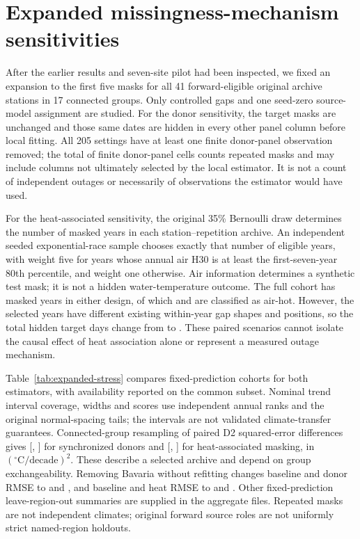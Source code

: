 \section{Expanded missingness-mechanism sensitivities}
After the earlier results and seven-site pilot had been inspected, we fixed an expansion to the first five masks for all 41 forward-eligible original archive stations in 17 connected groups. Only controlled gaps and one seed-zero source-model assignment are studied. For the donor sensitivity, the target masks are unchanged and those same dates are hidden in every other panel column before local fitting. All 205 settings have at least one finite donor-panel observation removed; the total of \ESDonorCells{} finite donor-panel cells counts repeated masks and may include columns not ultimately selected by the local estimator. It is not a count of independent outages or necessarily of observations the estimator would have used.

For the heat-associated sensitivity, the original 35\% Bernoulli draw determines the number of masked years in each station--repetition archive. An independent seeded exponential-race sample chooses exactly that number of eligible years, with weight five for years whose annual air H30 is at least the first-seven-year 80th percentile, and weight one otherwise. Air information determines a synthetic test mask; it is not a hidden water-temperature outcome. The full cohort has \ESYears{} masked years in either design, of which \ESHotBaseline{} and \ESHotHeat{} are classified as air-hot. However, the selected years have different existing within-year gap shapes and positions, so the total hidden target days change from \ESDaysBaseline{} to \ESDaysHeat{}. These paired scenarios cannot isolate the causal effect of heat association alone or represent a measured outage mechanism.

Table~\ref{tab:expanded-stress} compares fixed-prediction cohorts for both estimators, with availability reported on the common subset. Nominal trend interval coverage, widths and scores use independent annual ranks and the original normal-spacing tails; the intervals are not validated climate-transfer guarantees. Connected-group resampling of paired D2 squared-error differences gives [\ESDonorLow, \ESDonorHigh] for synchronized donors and [\ESHeatLow, \ESHeatHigh] for heat-associated masking, in $({}^{\circ}\mathrm{C}/\mathrm{decade})^2$. These describe a selected archive and depend on group exchangeability. Removing Bavaria without refitting changes baseline and donor RMSE to \ESBavariaDonorBase{} and \ESBavariaDonorStress{}, and baseline and heat RMSE to \ESBavariaHeatBase{} and \ESBavariaHeatStress{}. Other fixed-prediction leave-region-out summaries are supplied in the aggregate files. Repeated masks are not independent climates; original forward source roles are not uniformly strict named-region holdouts.

